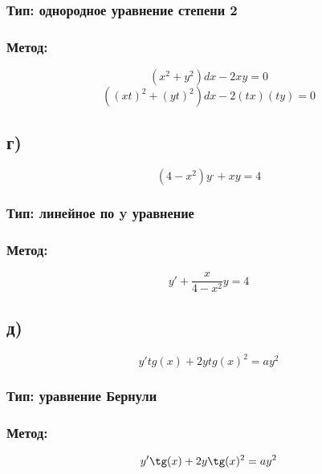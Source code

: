 \documentclass[a4paper]{article}
\begin{document}
\subsubsection*{Тип: однородное уравнение степени 2}

\subsubsection*{Метод:}
\begin{equation*}
(x^2+ y^2)dx - 2xy = 0
\end{equation*}
\begin{equation*}
((xt)^2+ (yt)^2)dx - 2(tx)(ty) = 0
\end{equation*}

\subsection*{г)}
\begin{equation*}
(4 - x^2)y^, + xy = 4
\end{equation*}
\subsubsection*{Тип: линейное по y уравнение}

\subsubsection*{Метод:}
\begin{equation*}
y' + \frac{x}{4 - x^2}y = 4
\end{equation*}

\subsection*{д)}
\begin{equation*}
y' tg(x) + 2y tg(x)^2 = a y^2
\end{equation*}
\subsubsection*{Тип: уравнение Бернули}

\subsubsection*{Метод:}
\begin{equation*}
y'\tg(x) + 2y\tg(x)^2 = a y^2
\end{equation*}
\end{document}
